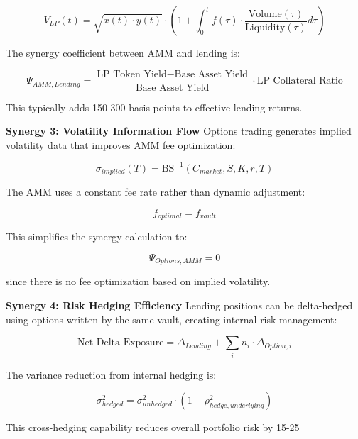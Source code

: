 \documentclass[12pt]{article}
\begin{document}
\begin{equation}
V_{LP}(t) = \sqrt{x(t) \cdot y(t)} \cdot \left(1 + \int_0^t f(\tau) \cdot \frac{\text{Volume}(\tau)}{\text{Liquidity}(\tau)} d\tau\right)
\end{equation}

The synergy coefficient between AMM and lending is:

\begin{equation}
\Psi_{AMM,Lending} = \frac{\text{LP Token Yield} - \text{Base Asset Yield}}{\text{Base Asset Yield}} \cdot \text{LP Collateral Ratio}
\end{equation}

This typically adds 150-300 basis points to effective lending returns.

\textbf{Synergy 3: Volatility Information Flow}
Options trading generates implied volatility data that improves AMM fee optimization:

\begin{equation}
\sigma_{implied}(T) = \text{BS}^{-1}(C_{market}, S, K, r, T)
\end{equation}

The AMM uses a constant fee rate rather than dynamic adjustment:

\begin{equation}
f_{optimal} = f_{vault}
\end{equation}

This simplifies the synergy calculation to:

\begin{equation}
\Psi_{Options,AMM} = 0
\end{equation}

since there is no fee optimization based on implied volatility.

\textbf{Synergy 4: Risk Hedging Efficiency}
Lending positions can be delta-hedged using options written by the same vault, creating internal risk management:

\begin{equation}
\text{Net Delta Exposure} = \Delta_{Lending} + \sum_i n_i \cdot \Delta_{Option,i}
\end{equation}

The variance reduction from internal hedging is:

\begin{equation}
\sigma^2_{hedged} = \sigma^2_{unhedged} \cdot \left(1 - \rho^2_{hedge,underlying}\right)
\end{equation}

This cross-hedging capability reduces overall portfolio risk by 15-25%
\end{document}
